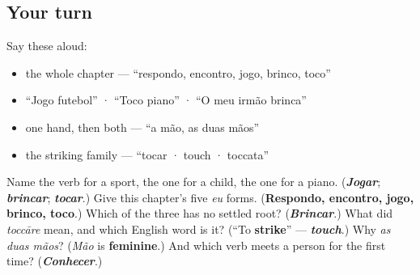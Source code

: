 \subsection*{Your turn}
Say these aloud:

\begin{itemize}
\raggedright
  \item the whole chapter — \textquotedblleft{}respondo, encontro, jogo, brinco, toco\textquotedblright{}
  \item \textquotedblleft{}Jogo futebol\textquotedblright{} · \textquotedblleft{}Toco piano\textquotedblright{} · \textquotedblleft{}O meu irmão brinca\textquotedblright{}
  \item one hand, then both — \textquotedblleft{}a mão, as duas mãos\textquotedblright{}
  \item the striking family — \textquotedblleft{}tocar · touch · toccata\textquotedblright{}
\end{itemize}

\begin{tcolorbox}[breakable,colback=teal!4,colframe=teal!35!black,title={Before you move on}]
Name the verb for a sport, the one for a child, the one for a piano. (\emph{\textbf{Jogar}}; \emph{\textbf{brincar}}; \emph{\textbf{tocar}}.) Give this chapter's five \emph{eu} forms. (\textbf{Respondo, encontro, jogo, brinco, toco}.) Which of the three has no settled root? (\emph{\textbf{Brincar}}.) What did \emph{toccāre} mean, and which English word is it? (\textquotedblleft{}To \textbf{strike}\textquotedblright{} — \emph{\textbf{touch}}.) Why \emph{as duas mãos}? (\emph{Mão} is \textbf{feminine}.) And which verb meets a person for the first time? (\emph{\textbf{Conhecer}}.)
\end{tcolorbox}
